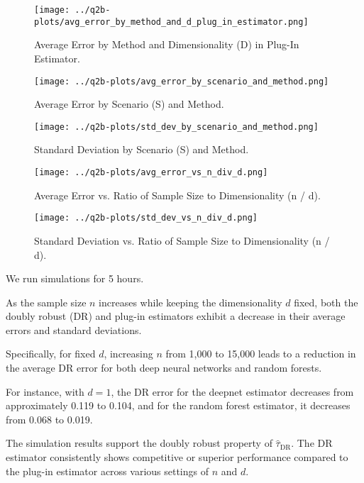 \documentclass{article}
\begin{document}
{\begin{figure}[H]
  \centering
  \texttt{[image: ../q2b-plots/avg\_error\_by\_method\_and\_d\_plug\_in\_estimator.png]}
  \caption{Average Error by Method and Dimensionality (D) in Plug-In Estimator.}
\end{figure}

\begin{figure}[H]
  \centering
  \texttt{[image: ../q2b-plots/avg\_error\_by\_scenario\_and\_method.png]}
  \caption{Average Error by Scenario (S) and Method.}
\end{figure}

\begin{figure}[H]
  \centering
  \texttt{[image: ../q2b-plots/std\_dev\_by\_scenario\_and\_method.png]}
  \caption{Standard Deviation by Scenario (S) and Method.}
\end{figure}

\begin{figure}[H]
  \centering
  \texttt{[image: ../q2b-plots/avg\_error\_vs\_n\_div\_d.png]}
  \caption{Average Error vs. Ratio of Sample Size to Dimensionality (n / d).}
\end{figure}

\begin{figure}[H]
  \centering
  \texttt{[image: ../q2b-plots/std\_dev\_vs\_n\_div\_d.png]}
  \caption{Standard Deviation vs. Ratio of Sample Size to Dimensionality (n / d).}
\end{figure}
}{}

We run simulations for 5 hours.
  
As the sample size \( n \) increases while keeping the dimensionality \( d \) fixed, both the doubly robust (DR) and plug-in estimators exhibit a decrease in their average errors and standard deviations.

Specifically, for fixed \( d \), increasing \( n \) from 1,000 to 15,000 leads to a reduction in the average DR error for both deep neural networks and random forests.

For instance, with \( d = 1 \), the DR error for the deepnet estimator decreases from approximately 0.119 to 0.104, and for the random forest estimator, it decreases from 0.068 to 0.019.

The simulation results support the doubly robust property of \( \hat{\tau}_{\text{DR}} \). The DR estimator consistently shows competitive or superior performance compared to the plug-in estimator across various settings of \( n \) and \( d \).
\end{document}
